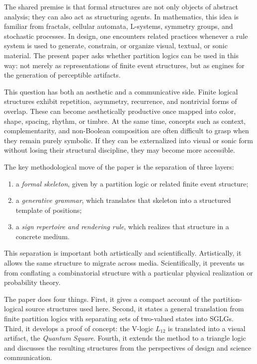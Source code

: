 \documentclass[
  10pt,
  twocolumn,
  aps,
  pra,
  showkeys,
  amsmath,amssymb,
  longbibliography
]{revtex4-2}
\begin{document}
The shared premise is that formal structures are not only objects of abstract analysis; they can also act as structuring agents. In mathematics, this idea is familiar from fractals, cellular automata, L-systems, symmetry groups, and stochastic processes. In design, one encounters related practices whenever a rule system is used to generate, constrain, or organize visual, textual, or sonic material. The present paper asks whether partition logics can be used in this way: not merely as representations of finite event structures, but as engines for the generation of perceptible artifacts.

This question has both an aesthetic and a communicative side. Finite logical structures exhibit repetition, asymmetry, recurrence, and nontrivial forms of overlap. These can become aesthetically productive once mapped into color, shape, spacing, rhythm, or timbre. At the same time, concepts such as context, complementarity, and non-Boolean composition are often difficult to grasp when they remain purely symbolic. If they can be externalized into visual or sonic form without losing their structural discipline, they may become more accessible.

The key methodological move of the paper is the separation of three layers:
\begin{enumerate}
\item a \emph{formal skeleton}, given by a partition logic or related finite event structure;
\item a \emph{generative grammar}, which translates that skeleton into a structured template of positions;
\item a \emph{sign repertoire and rendering rule}, which realizes that structure in a concrete medium.
\end{enumerate}
This separation is important both artistically and scientifically. Artistically, it allows the same structure to migrate across media. Scientifically, it prevents us from conflating a combinatorial structure with a particular physical realization or probability theory.

The paper does four things. First, it gives a compact account of the partition-logical source structures used here. Second, it states a general translation from finite partition logics with separating sets of two-valued states into SGLGs. Third, it develops a proof of concept: the V-logic \(L_{12}\) is translated into a visual artifact, the \emph{Quantum Square}. Fourth, it extends the method to a triangle logic and discusses the resulting structures from the perspectives of design and science communication.
\end{document}
